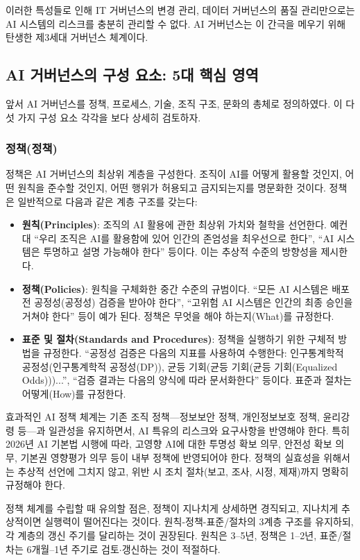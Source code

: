 이러한 특성들로 인해 IT 거버넌스의 변경 관리, 데이터 거버넌스의 품질 관리만으로는 AI 시스템의 리스크를 충분히 관리할 수 없다. AI 거버넌스는 이 간극을 메우기 위해 탄생한 제3세대 거버넌스 체계이다.\cite{dafoe2018aigovernance}

\subsection{AI 거버넌스의 구성 요소: 5대 핵심 영역}
앞서 AI 거버넌스를 정책, 프로세스, 기술, 조직 구조, 문화의 총체로 정의하였다. 이 다섯 가지 구성 요소 각각을 보다 상세히 검토하자.

\subsubsection*{정책(정책)}
정책은 AI 거버넌스의 최상위 계층을 구성한다. 조직이 AI를 어떻게 활용할 것인지, 어떤 원칙을 준수할 것인지, 어떤 행위가 허용되고 금지되는지를 명문화한 것이다. 정책은 일반적으로 다음과 같은 계층 구조를 갖는다:
\begin{itemize}
 \item \textbf{원칙(Principles)}: 조직의 AI 활용에 관한 최상위 가치와 철학을 선언한다. 예컨대 ``우리 조직은 AI를 활용함에 있어 인간의 존엄성을 최우선으로 한다'', ``AI 시스템은 투명하고 설명 가능해야 한다'' 등이다. 이는 추상적 수준의 방향성을 제시한다.
 \item \textbf{정책(Policies)}: 원칙을 구체화한 중간 수준의 규범이다. ``모든 AI 시스템은 배포 전 공정성(공정성) 검증을 받아야 한다'', ``고위험 AI 시스템은 인간의 최종 승인을 거쳐야 한다'' 등이 예가 된다. 정책은 무엇을 해야 하는지(What)를 규정한다.
 \item \textbf{표준 및 절차(Standards and Procedures)}: 정책을 실행하기 위한 구체적 방법을 규정한다. ``공정성 검증은 다음의 지표를 사용하여 수행한다: 인구통계학적 공정성(인구통계학적 공정성(DP)), 균등 기회(균등 기회(균등 기회(Equalized Odds)))...'', ``검증 결과는 다음의 양식에 따라 문서화한다'' 등이다. 표준과 절차는 어떻게(How)를 규정한다.
\end{itemize}
효과적인 AI 정책 체계는 기존 조직 정책---정보보안 정책, 개인정보보호 정책, 윤리강령 등---과 일관성을 유지하면서, AI 특유의 리스크와 요구사항을 반영해야 한다. 특히 2026년 AI 기본법 시행에 따라, 고영향 AI에 대한 투명성 확보 의무, 안전성 확보 의무, 기본권 영향평가 의무 등이 내부 정책에 반영되어야 한다. 정책의 실효성을 위해서는 추상적 선언에 그치지 않고, 위반 시 조치 절차(보고, 조사, 시정, 제재)까지 명확히 규정해야 한다.

정책 체계를 수립할 때 유의할 점은, 정책이 지나치게 상세하면 경직되고, 지나치게 추상적이면 실행력이 떨어진다는 것이다. 원칙-정책-표준/절차의 3계층 구조를 유지하되, 각 계층의 갱신 주기를 달리하는 것이 권장된다. 원칙은 3--5년, 정책은 1--2년, 표준/절차는 6개월--1년 주기로 검토$\cdot$갱신하는 것이 적절하다.

